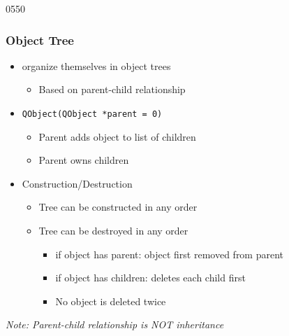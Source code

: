 \begin{slide}[fragile]{0550} \label{parent_child} \frametitle{Object Tree}
\begin{itemize}
  \item {} organize themselves in object trees
    \begin{itemize}
    \item Based on parent-child relationship
    \end{itemize}
  \item \texttt{QObject(QObject *parent = 0)}
    \begin{itemize}
    \item Parent adds object to list of children
    \item Parent owns children
    \end{itemize}
  \item Construction/Destruction
    \begin{itemize}
   \item Tree can be constructed in any order
    \item Tree can be destroyed in any order
      \begin{itemize}
      \item if object has parent: object first removed from parent
      \item if object has children: deletes each child first
      \item No object is deleted twice
      \end{itemize}
    \end{itemize}
 \end{itemize}
 \medskip
  \textit{Note: Parent-child relationship is NOT inheritance}
\end{slide}



